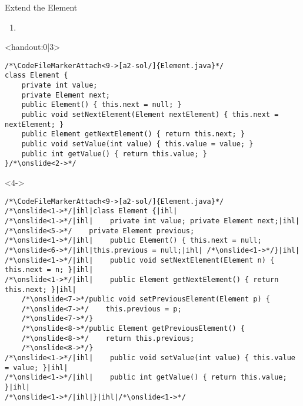 {\begin{frame}[fragile,c]{Extend the Element}
\begin{enumerate}[<+(1)->]
    \item {}
\end{enumerate}
\SetupLstHl{}
\begin{onlyenv}<handout:0|3>
\begin{verbatim}
/*\CodeFileMarkerAttach<9->[a2-sol/]{Element.java}*/
class Element {
    private int value;
    private Element next;
    public Element() { this.next = null; }
    public void setNextElement(Element nextElement) { this.next = nextElement; }
    public Element getNextElement() { return this.next; }
    public void setValue(int value) { this.value = value; }
    public int getValue() { return this.value; }
}/*\onslide<2->*/
\end{verbatim}
\end{onlyenv}
\begin{onlyenv}<4->
\begin{verbatim}
/*\CodeFileMarkerAttach<9->[a2-sol/]{Element.java}*/
/*\onslide<1->*/|ihl|class Element {|ihl|
/*\onslide<1->*/|ihl|    private int value; private Element next;|ihl|
/*\onslide<5->*/    private Element previous;
/*\onslide<1->*/|ihl|    public Element() { this.next = null;  /*\onslide<6->*/|ihl|this.previous = null;|ihl| /*\onslide<1->*/}|ihl|
/*\onslide<1->*/|ihl|    public void setNextElement(Element n) { this.next = n; }|ihl|
/*\onslide<1->*/|ihl|    public Element getNextElement() { return this.next; }|ihl|
    /*\onslide<7->*/public void setPreviousElement(Element p) {
    /*\onslide<7->*/    this.previous = p;
    /*\onslide<7->*/}
    /*\onslide<8->*/public Element getPreviousElement() {
    /*\onslide<8->*/    return this.previous;
    /*\onslide<8->*/}
/*\onslide<1->*/|ihl|    public void setValue(int value) { this.value = value; }|ihl|
/*\onslide<1->*/|ihl|    public int getValue() { return this.value; }|ihl|
/*\onslide<1->*/|ihl|}|ihl|/*\onslide<1->*/
\end{verbatim}
\end{onlyenv}
\end{frame}

}
